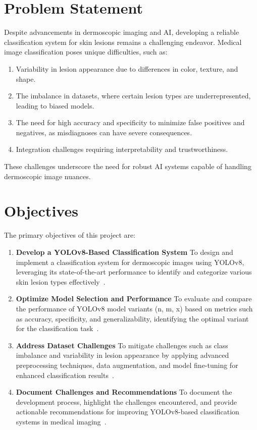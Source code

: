 \documentclass[a4paper,12pt]{report}
\begin{document}
\begin{spacing}{1.5}
    \section{Problem Statement}
    Despite advancements in dermoscopic imaging and AI, developing a reliable classification system for skin lesions remains a challenging endeavor. Medical image classification poses unique difficulties, such as:
    \begin{enumerate}
        \item Variability in lesion appearance due to differences in color, texture, and shape.
        \item The imbalance in datasets, where certain lesion types are underrepresented, leading to biased models.
        \item The need for high accuracy and specificity to minimize false positives and negatives, as misdiagnoses can have severe consequences.
        \item Integration challenges requiring interpretability and trustworthiness.
    \end{enumerate}
    These challenges underscore the need for robust AI systems capable of handling dermoscopic image nuances\cite{intro5}\cite{intro6}.

    \section{Objectives}
    The primary objectives of this project are:
    \begin{enumerate}
        \item \textbf{Develop a YOLOv8-Based Classification System} To design and implement a classification system for dermoscopic images using YOLOv8, leveraging its state-of-the-art performance to identify and categorize various skin lesion types effectively~\cite{ultralytics23}.
        \item \textbf{Optimize Model Selection and Performance} To evaluate and compare the performance of YOLOv8 model variants (n, m, x) based on metrics such as accuracy, specificity, and generalizability, identifying the optimal variant for the classification task~\cite{intro9}.
        \item \textbf{Address Dataset Challenges} To mitigate challenges such as class imbalance and variability in lesion appearance by applying advanced preprocessing techniques, data augmentation, and model fine-tuning for enhanced classification results~\cite{dl7}.
        \item \textbf{Document Challenges and Recommendations} To document the development process, highlight the challenges encountered, and provide actionable recommendations for improving YOLOv8-based classification systems in medical imaging~\cite{intro5}.
    \end{enumerate}


\end{spacing}
\end{document}
